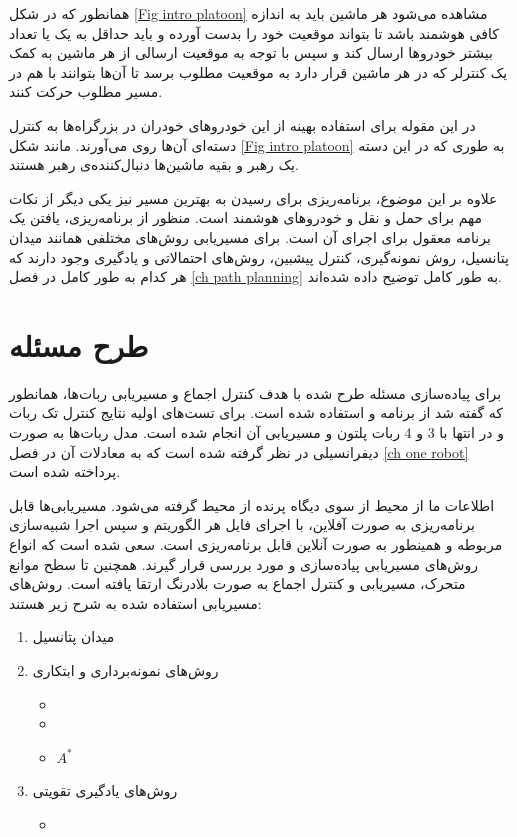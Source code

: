 همانطور که در شکل \ref{Fig intro platoon} مشاهده می‌شود هر ماشین باید به اندازه کافی هوشمند باشد تا بتواند موقعیت خود را بدست آورده و باید حداقل به یک یا تعداد بیشتر خودروها ارسال کند و سپس با توجه به موقعیت ارسالی از هر ماشین به کمک یک کنترلر که در هر ماشین قرار دارد به موقعیت مطلوب برسد تا آن‌ها بتوانند با هم در مسیر مطلوب حرکت کنند.

در این مقوله برای استفاده بهینه از این خودروهای خودران در بزرگراه‌ها به کنترل دسته‌ای آن‌ها روی می‌آورند. مانند شکل \ref{Fig intro platoon} به طوری که در این دسته یک رهبر و بقیه ماشین‌ها دنبال‌کننده‌ی رهبر هستند.

علاوه بر این موضوع، برنامه‌ریزی برای رسیدن به بهترین مسیر نیز یکی دیگر از نکات مهم برای حمل و نقل و خودروهای هوشمند است. منظور از برنامه‌ریزی، یافتن یک برنامه معقول برای اجرای آن است. برای مسیریابی روش‌های مختلفی همانند میدان پتانسیل، روش نمونه‌گیری، کنترل پیشبین، روش‌های احتمالاتی\cite{lefkopoulos2019using} و یادگیری وجود دارند که هر کدام به طور کامل در فصل \ref{ch path planning} به طور کامل توضیح داده شده‌اند.

\section{طرح مسئله}
برای پیاده‌سازی مسئله طرح شده با هدف کنترل اجماع و مسیریابی ربات‌ها، همانطور که گفته شد از برنامه  و  استفاده شده است. برای تست‌های اولیه نتایج کنترل تک ربات و در انتها با 3 و 4 ربات پلتون و مسیریابی آن انجام شده است. مدل ربات‌ها به صورت دیفرانسیلی در نظر گرفته شده است که به معادلات آن در فصل \ref{ch one robot} پرداخته شده است.

اطلاعات ما از محیط از سوی دیگاه پرنده از محیط گرفته می‌شود. مسیریابی‌ها قابل برنامه‌ریزی به صورت آفلاین، با اجرای فایل  هر الگوریتم و سپس اجرا شبیه‌سازی مربوطه و همینطور به صورت آنلاین قابل برنامه‌ریزی است. سعی شده است که انواع روش‌های مسیریابی پیاده‌سازی و مورد بررسی قرار گیرند. همچنین تا سطح موانع متحرک، مسیریابی و کنترل اجماع به صورت بلادرنگ ارتقا یافته است.
روش‌های مسیریابی استفاده شده به شرح زیر هستند:
\begin{enumerate}
	\item میدان پتانسیل
	\item روش‌های نمونه‌برداری و ابتکاری
	\begin{itemize}
		\item {}
		\item {}
		\item $A^*$
	\end{itemize}
	\item روش‌های یادگیری تقویتی
	\begin{itemize}
		\item {}
	\end{itemize}
\end{enumerate}

